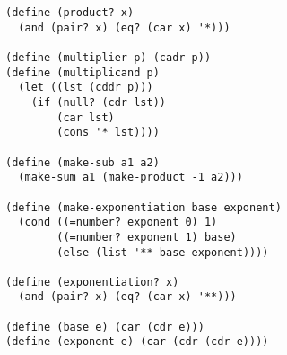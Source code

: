 \documentclass[a4paper,12pt]{article}
\begin{document}
\begin{lstlisting}
(define (product? x)
  (and (pair? x) (eq? (car x) '*)))

(define (multiplier p) (cadr p))
(define (multiplicand p)
  (let ((lst (cddr p)))
    (if (null? (cdr lst))
        (car lst)
        (cons '* lst))))

(define (make-sub a1 a2)
  (make-sum a1 (make-product -1 a2)))

(define (make-exponentiation base exponent)
  (cond ((=number? exponent 0) 1)
        ((=number? exponent 1) base)
        (else (list '** base exponent))))

(define (exponentiation? x)
  (and (pair? x) (eq? (car x) '**)))

(define (base e) (car (cdr e)))
(define (exponent e) (car (cdr (cdr e))))
\end{lstlisting}
\end{document}
